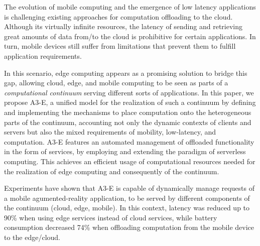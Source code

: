 
The evolution of mobile computing and the emergence of low latency applications is challenging existing approaches for computation offloading to the cloud. Although its virtually infinite resources, the latency of sending and retrieving great amounts of data from/to the cloud is prohibitive for certain applications. In turn, mobile devices still suffer from limitations that prevent them to fulfill application requirements.


In this scenario, edge computing appears as a promising solution to bridge this gap, allowing cloud, edge, and mobile computing to be seen as parts of a \textit{computational continuum} serving different sorts of applications. In this paper, we propose A3-E, %
a unified model for the realization of such a continuum by defining and implementing the mechanisms to place computation onto the heterogeneous parts of the continuum, accounting not only the dynamic contexts of clients and servers but also the mixed requirements of mobility, low-latency, and computation. A3-E features an automated management of offloaded functionality in the form of services, by employing and extending the paradigm of serverless computing. This achieves an efficient usage of computational resources needed for the realization of edge computing and consequently of the continuum.

Experiments have shown that A3-E is capable of dynamically manage requests of a mobile agumented-reality application, to be served by different components of the continuum (cloud, edge, mobile). In this context, latency was reduced up to 90\% when using edge services instead of cloud services, while battery consumption decreased 74\% when offloading computation from the mobile device to the edge/cloud.%


